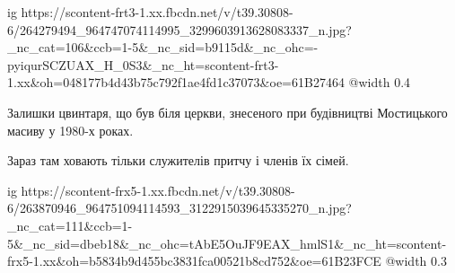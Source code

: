  
 
 
 
 

\ifcmt
  ig https://scontent-frt3-1.xx.fbcdn.net/v/t39.30808-6/264279494_964747074114995_3299603913628083337_n.jpg?_nc_cat=106&ccb=1-5&_nc_sid=b9115d&_nc_ohc=-pyiqurSCZUAX_H_0S3&_nc_ht=scontent-frt3-1.xx&oh=048177b4d43b75c792f1ae4fd1c37073&oe=61B27464
  @width 0.4
\fi


Залишки цвинтаря, що був біля церкви, знесеного при будівництві Мостицького
масиву у 1980-х роках.


Зараз там ховають тільки служителів притчу і членів їх сімей.

\ifcmt
  ig https://scontent-frx5-1.xx.fbcdn.net/v/t39.30808-6/263870946_964751094114593_3122915039645335270_n.jpg?_nc_cat=111&ccb=1-5&_nc_sid=dbeb18&_nc_ohc=tAbE5OuJF9EAX_hmlS1&_nc_ht=scontent-frx5-1.xx&oh=b5834b9d455bc3831fca00521b8cd752&oe=61B23FCE
  @width 0.3
\fi
